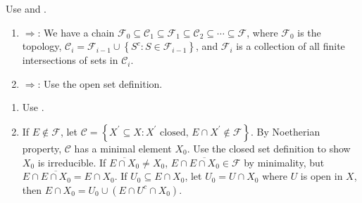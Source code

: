 \begin{exercise}\label{ex7.16}
	Use  and .
\end{exercise}

\begin{exercise}\label{ex7.17}
	
\end{exercise}

\begin{exercise}\label{ex7.18}
	
\end{exercise}

\begin{exercise}\label{ex7.19}
	
\end{exercise}

\begin{exercise}\label{ex7.20}
	\begin{enumerate}[label=(\roman*),ref=\theexercise(\roman*)]
		\item $\Rightarrow$: We have a chain $\mathcal{F}_0\subseteq\mathcal{C}_1\subseteq\mathcal{F}_1\subseteq\mathcal{C}_2\subseteq\cdots\subseteq\mathcal{F}$, where $\mathcal{F}_0$ is the topology, $\mathcal{C}_i=\mathcal{F}_{i-1}\cup\left\{S^c:S\in\mathcal{F}_{i-1}\right\}$, and $\mathcal{F}_i$ is a collection of all finite intersections of sets in $\mathcal{C}_i$.
		\item $\Rightarrow$: Use the open set definition.
	\end{enumerate}
\end{exercise}

\begin{exercise}\label{ex7.21}
	\begin{enumerate}
		\item[$\Rightarrow$:] Use .
		\item[$\Leftarrow$:] If $E\notin\mathcal{F}$, let $\mathcal{C}=\left\{X^\prime\subseteq X:X^\prime\text{ closed, }E\cap X^\prime\notin\mathcal{F}\right\}$. By Noetherian property, $\mathcal{C}$ has a minimal element $X_0$. Use the closed set definition to show $X_0$ is irreducible. If $\overline{E\cap X_0}\neq X_0$, $E\cap\overline{E\cap X_0}\in\mathcal{F}$ by minimality, but $E\cap\overline{E\cap X_0}=E\cap X_0$. If $U_0\subseteq E\cap X_0$, let $U_0=U\cap X_0$ where $U$ is open in $X$, then $E\cap X_0=U_0\cup\left(E\cap U^c\cap X_0\right)$.
	\end{enumerate}
\end{exercise}

